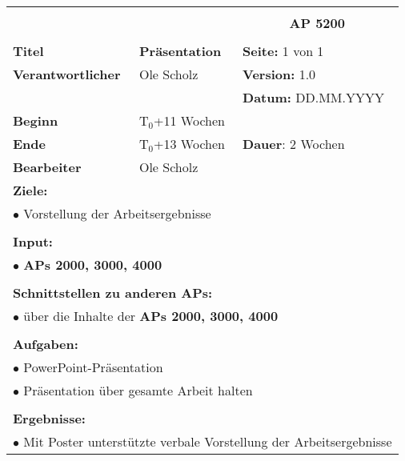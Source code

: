 \clearpage
\begin{table}[!h]
	\begin{center}
		\begin{tabular}{|p{35mm}||p{55mm}|p{50mm}||p{40mm}|}
			\hline
			\multicolumn{3}{|l||}{\textbf{}} & \multicolumn{1}{c|}{}\\
			\multicolumn{3}{|l||}{\textbf{}} & \multicolumn{1}{c|}{\textbf{AP 5200}}\\
			\multicolumn{3}{|l||}{\textbf{}} & \multicolumn{1}{c|}{}\\
			\hline\hline
			\textbf{Titel} & \multicolumn{2}{p{7cm}||}{\textbf{Präsentation}} 
			& \textbf{Seite:} 1 von 1\\
			\hline
			\textbf{Verantwortlicher} & \multicolumn{2}{l||}{Ole Scholz} & \textbf{Version:} 1.0\\
			\hline
			\multicolumn{3}{|l||}{} & \textbf{Datum:} DD.MM.YYYY\\
			\hline\hline
			\textbf{Beginn} & \multicolumn{2}{l||}{T$_0$+11 Wochen} & \\
			\hline
			\textbf{Ende} & \multicolumn{2}{l||}{T$_0$+13 Wochen} & \textbf{Dauer}: 2 Wochen\\
			\hline\hline
			\textbf{Bearbeiter} & \multicolumn{3}{l|}{Ole Scholz}\\
			\hline\hline
			\multicolumn{4}{|p{150mm}|}{\textbf{Ziele:}}\\
			\multicolumn{4}{|p{150mm}|}{$\bullet$ Vorstellung der Arbeitsergebnisse}\\
			\multicolumn{4}{|p{150mm}|}{}\\
			\multicolumn{4}{|p{150mm}|}{\textbf{Input:}}\\
			\multicolumn{4}{|p{150mm}|}{$\bullet$ \textbf{APs 2000, 3000, 4000}}\\
			\multicolumn{4}{|p{150mm}|}{}\\
			\multicolumn{4}{|p{150mm}|}{\textbf{Schnittstellen zu anderen APs:}}\\
			\multicolumn{4}{|p{150mm}|}{$\bullet$ über die Inhalte der \textbf{APs 2000, 3000, 4000}}\\
			\multicolumn{4}{|p{150mm}|}{}\\
			\multicolumn{4}{|p{150mm}|}{\textbf{Aufgaben:}}\\
			\multicolumn{4}{|p{150mm}|}{$\bullet$ PowerPoint-Präsentation}\\
			\multicolumn{4}{|p{150mm}|}{$\bullet$ Präsentation über gesamte Arbeit halten}\\
			\multicolumn{4}{|p{150mm}|}{}\\
			\multicolumn{4}{|p{150mm}|}{\textbf{Ergebnisse:}}\\
			\multicolumn{4}{|p{150mm}|}{$\bullet$ Mit Poster unterstützte verbale Vorstellung der Arbeitsergebnisse}\\
			\hline
		\end{tabular}
	\end{center}
\end{table}

